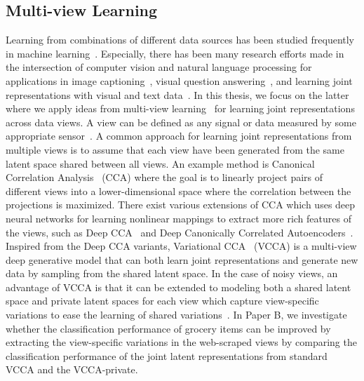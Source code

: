 \subsection{Multi-view Learning}

Learning from combinations of different data sources has been studied frequently in machine learning~\cite{baltruvsaitis2018multimodal, xu2013survey}. Especially, there has been many research efforts made in the intersection of computer vision and natural language processing for applications in image captioning~\cite{xu2015show, lu2018neural, aneja2019sequential}, visual question answering~\cite{antol2015vqa, hudson2018compositional, hu2019language}, and learning joint representations with visual and text data~\cite{vedantam2017generative, wu2018multimodal,shi2019variational}. In this thesis, we focus on the latter where we apply ideas from multi-view learning~\cite{xu2013survey} for learning joint representations across data views. A view can be defined as any signal or data measured by some appropriate sensor~\cite{salzmann2010factorized}. A common approach for learning joint representations from multiple views is to assume that each view have been generated from the same latent space shared between all views. An example method is Canonical Correlation Analysis~\cite{hotelling1936relations} (CCA) where the goal is to linearly project pairs of different views into a lower-dimensional space where the correlation between the projections is maximized. There exist various extensions of CCA which uses deep neural networks for learning nonlinear mappings to extract more rich features of the views, such as Deep CCA~\cite{andrew2013deep} and Deep Canonically Correlated Autoencoders~\cite{wang2015deep}. Inspired from the Deep CCA variants, Variational CCA~\cite{wang2016deep} (VCCA) is a multi-view deep generative model that can both learn joint representations and generate new data by sampling from the shared latent space. In the case of noisy views, an advantage of VCCA is that it can be extended to modeling both a shared latent space and private latent spaces for each view which capture view-specific variations to ease the learning of shared variations~\cite{hyvarinen2000independent, salzmann2010factorized, tsai2018learning, wang2016deep, zhang2016inter, damianou2021multi}. In Paper B, we investigate whether the classification performance of grocery items can be improved by extracting the view-specific variations in the web-scraped views by comparing the classification performance of the joint latent representations from standard VCCA and the VCCA-private.



